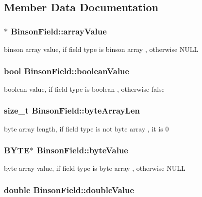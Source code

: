 \subsection{Member Data Documentation}
\hypertarget{structBinsonField_a40d1815efc1752e7702742db8c75a412}{
\subsubsection[{array\-Value}]{$\ast$ Binson\-Field\-::array\-Value}}\label{structBinsonField_a40d1815efc1752e7702742db8c75a412}
binson array value, if field type is binson array , otherwise N\-U\-L\-L \hypertarget{structBinsonField_afa4d89c72451975c7d417411620eb1e4}{
\subsubsection[{boolean\-Value}]{\setlength{\rightskip}{0pt plus 5cm}bool Binson\-Field\-::boolean\-Value}}\label{structBinsonField_afa4d89c72451975c7d417411620eb1e4}
boolean value, if field type is boolean , otherwise false \hypertarget{structBinsonField_a3b9044d4e96879907046a9f9bb8e5d66}{
\subsubsection[{byte\-Array\-Len}]{\setlength{\rightskip}{0pt plus 5cm}size\-\_\-t Binson\-Field\-::byte\-Array\-Len}}\label{structBinsonField_a3b9044d4e96879907046a9f9bb8e5d66}
byte array length, if field type is not byte array , it is 0 \hypertarget{structBinsonField_a71fab57bcc18cc20a8aad41674f3f9ee}{
\subsubsection[{byte\-Value}]{\setlength{\rightskip}{0pt plus 5cm}B\-Y\-T\-E$\ast$ Binson\-Field\-::byte\-Value}}\label{structBinsonField_a71fab57bcc18cc20a8aad41674f3f9ee}
byte array value, if field type is byte array , otherwise N\-U\-L\-L \hypertarget{structBinsonField_a4c3793330dba024f159946039066fa7c}{
\subsubsection[{double\-Value}]{\setlength{\rightskip}{0pt plus 5cm}double Binson\-Field\-::double\-Value}}\label{structBinsonField_a4c3793330dba024f159946039066fa7c}
